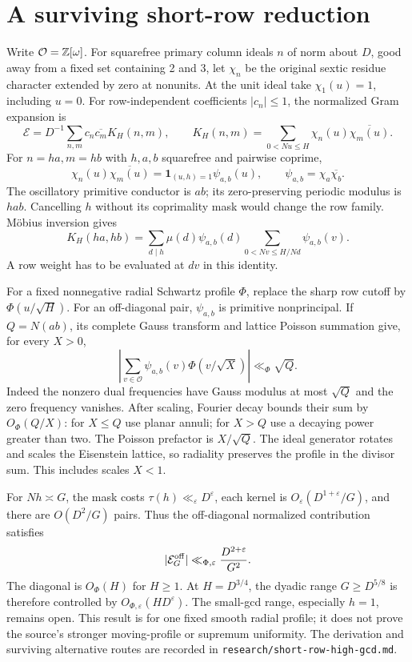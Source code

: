 \section{A surviving short-row reduction}
Write $\mathcal O=\mathbb Z[\omega]$. For squarefree primary column ideals $n$ of norm about $D$, good away from a fixed set containing 2 and 3, let $\chi_n$ be the original sextic residue character extended by zero at nonunits. At the unit ideal take $\chi_1(u)=1$, including $u=0$. For row-independent coefficients $|c_n|\le1$, the normalized Gram expansion is
\[
 \mathcal E=D^{-1}\sum_{n,m}c_n\overline{c_m}K_H(n,m),\qquad
 K_H(n,m)=\sum_{0<Nu\le H}\chi_n(u)\overline{\chi_m(u)}.
\]
For $n=ha,m=hb$ with $h,a,b$ squarefree and pairwise coprime,
\[
 \chi_n(u)\overline{\chi_m(u)}
 =\mathbf1_{(u,h)=1}\psi_{a,b}(u),\qquad \psi_{a,b}=\chi_a\overline{\chi_b}.
\]
The oscillatory primitive conductor is $ab$; its zero-preserving periodic modulus is $hab$. Cancelling $h$ without its coprimality mask would change the row family. M\"obius inversion gives
\[
 K_H(ha,hb)=\sum_{d\mid h}\mu(d)\psi_{a,b}(d)
  \sum_{0<Nv\le H/Nd}\psi_{a,b}(v).
\]
A row weight has to be evaluated at $dv$ in this identity.

For a fixed nonnegative radial Schwartz profile $\Phi$, replace the sharp row cutoff by $\Phi(u/\sqrt H)$. For an off-diagonal pair, $\psi_{a,b}$ is primitive nonprincipal. If $Q=N(ab)$, its complete Gauss transform and lattice Poisson summation give, for every $X>0$,
\[
 \left|\sum_{v\in\mathcal O}\psi_{a,b}(v)\Phi(v/\sqrt X)\right|\ll_\Phi\sqrt Q.
\]
Indeed the nonzero dual frequencies have Gauss modulus at most $\sqrt Q$ and the zero frequency vanishes. After scaling, Fourier decay bounds their sum by $O_\Phi(Q/X)$: for $X\le Q$ use planar annuli; for $X>Q$ use a decaying power greater than two. The Poisson prefactor is $X/\sqrt Q$. The ideal generator rotates and scales the Eisenstein lattice, so radiality preserves the profile in the divisor sum. This includes scales $X<1$.

For $Nh\asymp G$, the mask costs $\tau(h)\ll_\varepsilon D^\varepsilon$, each kernel is $O_\varepsilon(D^{1+\varepsilon}/G)$, and there are $O(D^2/G)$ pairs. Thus the off-diagonal normalized contribution satisfies
\[
 |\mathcal E_G^{\rm off}|\ll_{\Phi,\varepsilon}\frac{D^{2+\varepsilon}}{G^2}.
\]
The diagonal is $O_\Phi(H)$ for $H\ge1$. At $H=D^{3/4}$, the dyadic range $G\ge D^{5/8}$ is therefore controlled by $O_{\Phi,\varepsilon}(HD^\varepsilon)$. The small-gcd range, especially $h=1$, remains open. This result is for one fixed smooth radial profile; it does not prove the source's stronger moving-profile or supremum uniformity. The derivation and surviving alternative routes are recorded in \texttt{research/short-row-high-gcd.md}.

